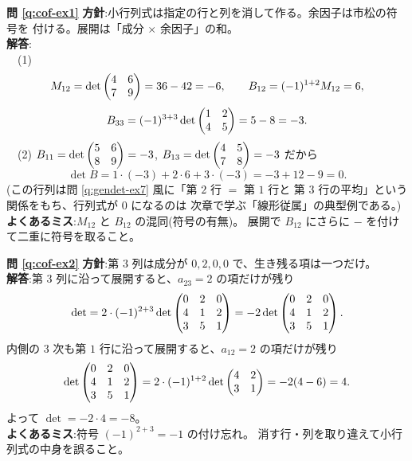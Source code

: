 \bigskip
\noindent\textbf{問 \ref{q:cof-ex1}}\quad
\textbf{方針}:小行列式は指定の行と列を消して作る。余因子は市松の符号を
付ける。展開は「成分 $\times$ 余因子」の和。\\
\textbf{解答}:\\
　(1)
\[
M_{12} = \det \begin{pmatrix}4 & 6 \\ 7 & 9\end{pmatrix} = 36 - 42 = -6, \qquad
B_{12} = (-1)^{1+2} M_{12} = 6,
\]
\[
B_{33} = (-1)^{3+3} \det \begin{pmatrix}1 & 2 \\ 4 & 5\end{pmatrix} = 5 - 8 = -3.
\]
　(2) $B_{11} = \det \begin{pmatrix}5 & 6 \\ 8 & 9\end{pmatrix} = -3$,
$B_{13} = \det \begin{pmatrix}4 & 5 \\ 7 & 8\end{pmatrix} = -3$ だから
\[
\det B = 1 \cdot (-3) + 2 \cdot 6 + 3 \cdot (-3) = -3 + 12 - 9 = 0.
\]
(この行列は問 \ref{q:gendet-ex7} 風に「第 $2$ 行 $=$ 第 $1$ 行と
第 $3$ 行の平均」という関係をもち、行列式が $0$ になるのは
次章で学ぶ「線形従属」の典型例である。)\\
\textbf{よくあるミス}:$M_{12}$ と $B_{12}$ の混同(符号の有無)。
展開で $B_{12}$ にさらに $-$ を付けて二重に符号を取ること。

\bigskip
\noindent\textbf{問 \ref{q:cof-ex2}}\quad
\textbf{方針}:第 $3$ 列は成分が $0, 2, 0, 0$ で、生き残る項は一つだけ。\\
\textbf{解答}:第 $3$ 列に沿って展開すると、$a_{23} = 2$ の項だけが残り
\[
\det = 2 \cdot (-1)^{2+3} \det \begin{pmatrix}0 & 2 & 0 \\ 4 & 1 & 2 \\ 3 & 5 & 1\end{pmatrix}
= -2 \det \begin{pmatrix}0 & 2 & 0 \\ 4 & 1 & 2 \\ 3 & 5 & 1\end{pmatrix}.
\]
内側の $3$ 次も第 $1$ 行に沿って展開すると、$a_{12} = 2$ の項だけが残り
\[
\det \begin{pmatrix}0 & 2 & 0 \\ 4 & 1 & 2 \\ 3 & 5 & 1\end{pmatrix}
= 2 \cdot (-1)^{1+2} \det \begin{pmatrix}4 & 2 \\ 3 & 1\end{pmatrix} = -2(4 - 6) = 4.
\]
よって $\det = -2 \cdot 4 = -8$。\\
\textbf{よくあるミス}:符号 $(-1)^{2+3} = -1$ の付け忘れ。
消す行・列を取り違えて小行列式の中身を誤ること。

